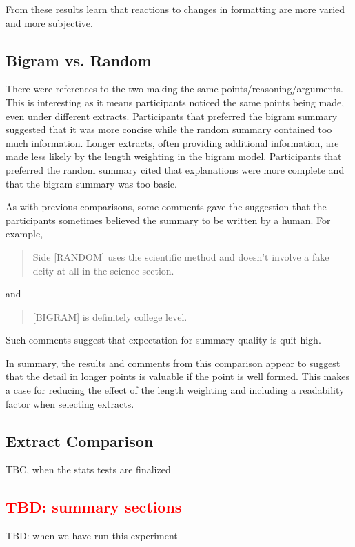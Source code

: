       From these results learn that reactions to changes in formatting are more varied and more subjective.

    \tocless\subsection{Bigram vs. Random}
      There were references to the two making the same points/reasoning/arguments. This is interesting as it means participants noticed the same points being made, even under different extracts. Participants that preferred the bigram summary suggested that it was more concise while the random summary contained too much information. Longer extracts, often providing additional information, are made less likely by the length weighting in the bigram model. Participants that preferred the random summary cited that explanations were more complete and that the bigram summary was too basic.

      As with previous comparisons, some comments gave the suggestion that the participants sometimes believed the summary to be written by a human. For example, \blockquote{Side [RANDOM] uses the scientific method and doesn't involve a fake deity at all in the science section.} and \blockquote{[BIGRAM] is definitely college level.}. Such comments suggest that expectation for summary quality is quit high.

      In summary, the results and comments from this comparison appear to suggest that the detail in longer points is valuable if the point is well formed. This makes a case for reducing the effect of the length weighting and including a readability factor when selecting extracts.

    \tocless\subsection{Extract Comparison}
      TBC, when the stats tests are finalized
    \tocless\subsection{\textcolor{red}{TBD: summary sections}}
      TBD: when we have run this experiment

